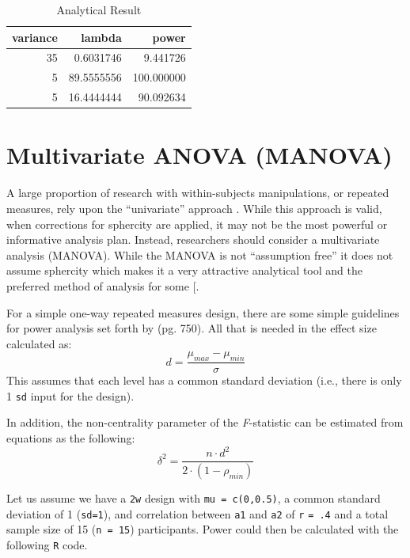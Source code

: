 \documentclass[]{book}
\begin{document}
\begin{table}[!h]

\caption{\label{tab:unnamed-chunk-170}Analytical Result}
\centering
\begin{tabular}{r|r|r}
\hline
variance & lambda & power\\
\hline
35 & 0.6031746 & 9.441726\\
\hline
5 & 89.5555556 & 100.000000\\
\hline
5 & 16.4444444 & 90.092634\\
\hline
\end{tabular}
\end{table}

\hypertarget{multivariate-anova-manova}{%
\section{Multivariate ANOVA (MANOVA)}\label{multivariate-anova-manova}}

A large proportion of research with within-subjects manipulations, or repeated measures, rely upon the ``univariate'' approach \citep{maxwell_designing_2004}. While this approach is valid, when corrections for sphercity are applied, it may not be the most powerful or informative analysis plan. Instead, researchers should consider a multivariate analysis (MANOVA). While the MANOVA is not ``assumption free'' it does not assume sphercity which makes it a very attractive analytical tool and the preferred method of analysis for some {[}\citet{maxwell_designing_2004}.

For a simple one-way repeated measures design, there are some simple guidelines for power analysis set forth by \citet{maxwell_designing_2004} (pg. 750). All that is needed in the effect size calculated as:
\[ d = \frac{\mu_{max}-\mu_{min}}{\sigma} \]
This assumes that each level has a common standard deviation (i.e., there is only 1 \texttt{sd} input for the design).

In addition, the non-centrality parameter of the \emph{F}-statistic can be estimated from \citet{vonesh1986sample} equations as the following:
\[ \delta^2 = \frac{n \cdot d^2}{2\cdot(1-\rho_{min} )} \]

Let us assume we have a \texttt{2w} design with \texttt{mu\ =\ c(0,0.5)}, a common standard deviation of 1 (\texttt{sd=1}), and correlation between \texttt{a1} and \texttt{a2} of \texttt{r} \texttt{=\ .4} and a total sample size of 15 (\texttt{n\ =\ 15}) participants.
Power could then be calculated with the following \texttt{R} code.
\end{document}
